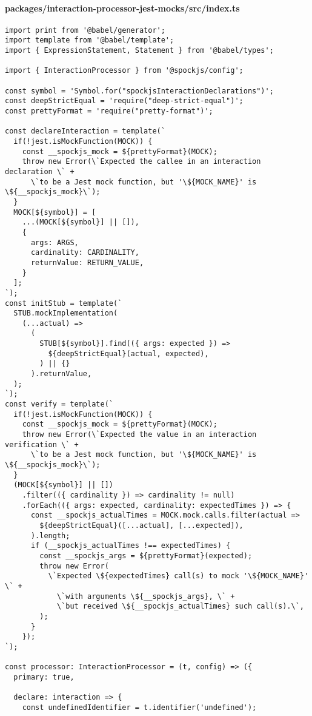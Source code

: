 \paragraph*{packages/interaction-processor-jest-mocks/src/index.ts}
\begin{verbatim}
import print from '@babel/generator';
import template from '@babel/template';
import { ExpressionStatement, Statement } from '@babel/types';

import { InteractionProcessor } from '@spockjs/config';

const symbol = 'Symbol.for("spockjsInteractionDeclarations")';
const deepStrictEqual = 'require("deep-strict-equal")';
const prettyFormat = 'require("pretty-format")';

const declareInteraction = template(`
  if(!jest.isMockFunction(MOCK)) {
    const __spockjs_mock = ${prettyFormat}(MOCK);
    throw new Error(\`Expected the callee in an interaction declaration \` +
      \`to be a Jest mock function, but '\${MOCK_NAME}' is \${__spockjs_mock}\`);
  }
  MOCK[${symbol}] = [
    ...(MOCK[${symbol}] || []),
    {
      args: ARGS,
      cardinality: CARDINALITY,
      returnValue: RETURN_VALUE,
    }
  ];
`);
const initStub = template(`
  STUB.mockImplementation(
    (...actual) =>
      (
        STUB[${symbol}].find(({ args: expected }) =>
          ${deepStrictEqual}(actual, expected),
        ) || {}
      ).returnValue,
  );
`);
const verify = template(`
  if(!jest.isMockFunction(MOCK)) {
    const __spockjs_mock = ${prettyFormat}(MOCK);
    throw new Error(\`Expected the value in an interaction verification \` +
      \`to be a Jest mock function, but '\${MOCK_NAME}' is \${__spockjs_mock}\`);
  }
  (MOCK[${symbol}] || [])
    .filter(({ cardinality }) => cardinality != null)
    .forEach(({ args: expected, cardinality: expectedTimes }) => {
      const __spockjs_actualTimes = MOCK.mock.calls.filter(actual =>
        ${deepStrictEqual}([...actual], [...expected]),
      ).length;
      if (__spockjs_actualTimes !== expectedTimes) {
        const __spockjs_args = ${prettyFormat}(expected);
        throw new Error(
          \`Expected \${expectedTimes} call(s) to mock '\${MOCK_NAME}' \` +
            \`with arguments \${__spockjs_args}, \` +
            \`but received \${__spockjs_actualTimes} such call(s).\`,
        );
      }
    });
`);

const processor: InteractionProcessor = (t, config) => ({
  primary: true,

  declare: interaction => {
    const undefinedIdentifier = t.identifier('undefined');


\end{verbatim}
